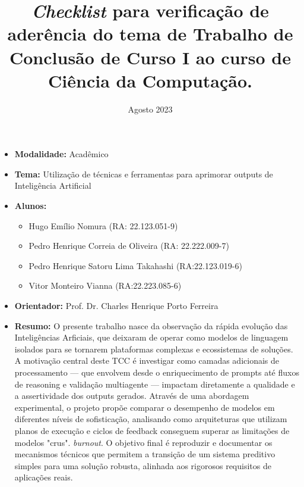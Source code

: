 \documentclass[11pt,a4,oneside]{article}
\title{\textit{Checklist} para verificação de aderência do tema de Trabalho de Conclusão de Curso I ao curso de Ciência da Computação.}
\date{Agosto 2023}
\begin{document}
\pagestyle{fancy}
\pagestyle{fancy}
\fancyhead{}

\maketitle
\begin{itemize}
\item \textbf{Modalidade:} Acadêmico
\item \textbf{Tema:} Utilização de técnicas e ferramentas para aprimorar outputs de Inteligência Artificial
\item \textbf{Alunos:}
\begin{itemize}
    \item Hugo Emílio Nomura (RA: 22.123.051-9)
    \item Pedro Henrique Correia de Oliveira (RA: 22.222.009-7)
    \item Pedro Henrique Satoru Lima Takahashi (RA:22.123.019-6)
    \item Vitor Monteiro Vianna (RA:22.223.085-6)
\end{itemize}
\item \textbf{Orientador:} Prof. Dr. Charles Henrique Porto Ferreira
\item \textbf{Resumo:} O presente trabalho nasce da observação da rápida evolução das Inteligências Arficiais, que deixaram de operar como modelos de linguagem isolados para se tornarem plataformas complexas e ecossistemas de soluções. A motivação central deste TCC é investigar como camadas adicionais de processamento — que envolvem desde o enriquecimento de prompts até fluxos de reasoning e validação multiagente — impactam diretamente a qualidade e a assertividade dos outputs gerados. Através de uma abordagem experimental, o projeto propõe comparar o desempenho de modelos em diferentes níveis de sofisticação, analisando como arquiteturas que utilizam planos de execução e ciclos de feedback conseguem superar as limitações de modelos "crus". 
\textit{burnout}. O objetivo final é reproduzir e documentar os mecanismos técnicos que permitem a transição de um sistema preditivo simples para uma solução robusta, alinhada aos rigorosos requisitos de aplicações reais.
\end{itemize}
\end{document}
